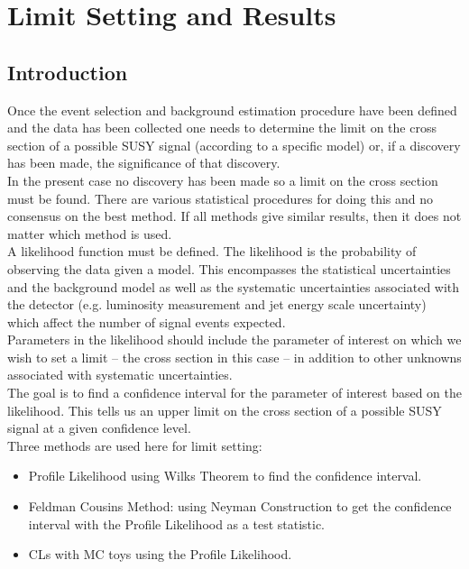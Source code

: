 \chapter{Limit Setting and Results}

\section{Introduction}

Once the event selection and background estimation procedure have been defined
and the data has been collected one needs to determine the limit on the cross
section of a possible SUSY signal (according to a specific model) or, if a 
discovery has been made, the significance of that discovery. \\

In the present case no discovery has been made so a limit on the cross section
must be found. There are various statistical procedures for doing this and no 
consensus on the best method. If all methods give similar results, then it does
not matter which method is used. \\

A likelihood function must be defined. The likelihood is the probability of 
observing the data given a model. This encompasses the statistical uncertainties
and the background model as well as the systematic uncertainties associated
with the detector (e.g. luminosity measurement and jet energy scale uncertainty)
which affect the number of signal events expected. \\

Parameters in the likelihood should include the parameter of interest on which 
we wish to set a limit -- the cross section in this case -- in addition to
other unknowns associated with systematic uncertainties. \\

The goal is to find a confidence interval for the parameter of interest based
on the likelihood. This tells us an upper limit on the cross section of a
 possible SUSY signal at a given confidence level. \\

Three methods are used here for limit setting:
\begin{itemize}
\item Profile Likelihood using Wilks Theorem to find the confidence interval.
\item Feldman Cousins Method: using Neyman Construction to get the confidence 
interval with the Profile Likelihood as a test statistic.
\item CLs with MC toys using the Profile Likelihood.
\end{itemize}

